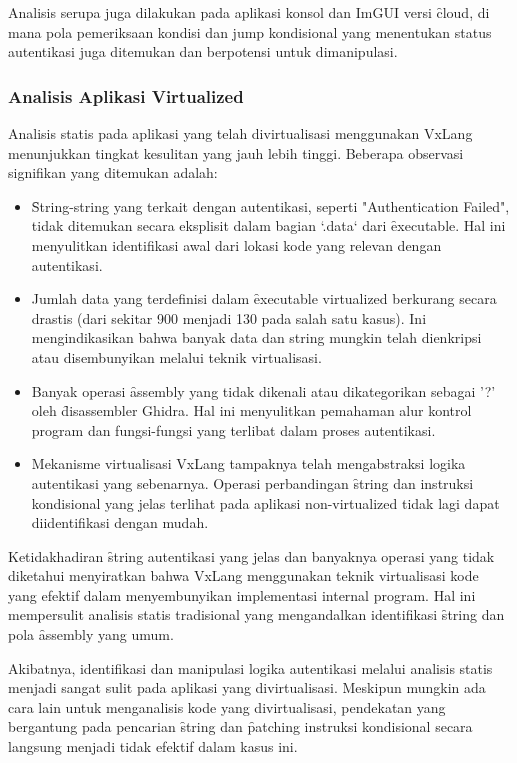 Analisis serupa juga dilakukan pada aplikasi konsol dan ImGUI versi \f{cloud}, di mana pola pemeriksaan kondisi dan jump kondisional yang menentukan status autentikasi juga ditemukan dan berpotensi untuk dimanipulasi.

\subsubsection{Analisis Aplikasi Virtualized}

Analisis statis pada aplikasi yang telah divirtualisasi menggunakan VxLang menunjukkan tingkat kesulitan yang jauh lebih tinggi. Beberapa observasi signifikan yang ditemukan adalah:

\begin{itemize}
  \item {} \f{String-string} yang terkait dengan autentikasi, seperti "Authentication Failed", tidak ditemukan secara eksplisit dalam bagian `.data` dari \f{executable}. Hal ini menyulitkan identifikasi awal dari lokasi kode yang relevan dengan autentikasi.
  \item {} Jumlah data yang terdefinisi dalam \f{executable} virtualized berkurang secara drastis (dari sekitar 900 menjadi 130 pada salah satu kasus). Ini mengindikasikan bahwa banyak data dan string mungkin telah dienkripsi atau disembunyikan melalui teknik virtualisasi.
  \item {} Banyak operasi \f{assembly} yang tidak dikenali atau dikategorikan sebagai '?' oleh \f{disassembler} Ghidra. Hal ini menyulitkan pemahaman alur kontrol program dan fungsi-fungsi yang terlibat dalam proses autentikasi.
  \item {} Mekanisme virtualisasi VxLang tampaknya telah mengabstraksi logika autentikasi yang sebenarnya. Operasi perbandingan \f{string} dan instruksi kondisional yang jelas terlihat pada aplikasi non-virtualized tidak lagi dapat diidentifikasi dengan mudah.
\end{itemize}

Ketidakhadiran \f{string} autentikasi yang jelas dan banyaknya operasi yang tidak diketahui menyiratkan bahwa VxLang menggunakan teknik virtualisasi kode yang efektif dalam menyembunyikan implementasi internal program. Hal ini mempersulit analisis statis tradisional yang mengandalkan identifikasi \f{string} dan pola \f{assembly} yang umum.

Akibatnya, identifikasi dan manipulasi logika autentikasi melalui analisis statis menjadi sangat sulit pada aplikasi yang divirtualisasi. Meskipun mungkin ada cara lain untuk menganalisis kode yang divirtualisasi, pendekatan yang bergantung pada pencarian \f{string} dan \f{patching} instruksi kondisional secara langsung menjadi tidak efektif dalam kasus ini.


